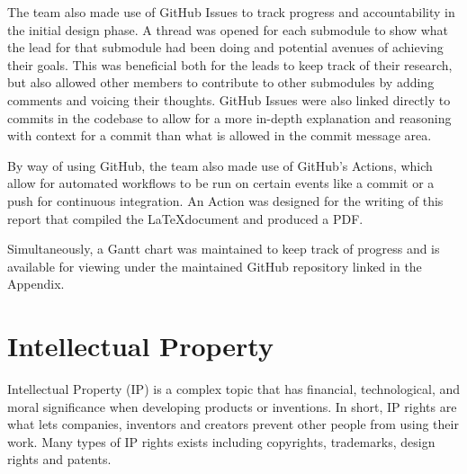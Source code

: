 \documentclass[a4paper]{article}
\begin{document}
The team also made use of GitHub Issues to track progress and accountability in 
the initial design phase. A thread was opened for each submodule to show what 
the lead for that submodule had been doing and potential avenues of achieving 
their goals. This was beneficial both for the leads to keep track of their 
research, but also allowed other members to contribute to other submodules 
by adding comments and voicing their thoughts. GitHub Issues were also linked 
directly to commits in the codebase to allow for a more in-depth explanation and
reasoning with context for a commit than what is allowed in the commit message 
area. 

By way of using GitHub, the team also made use of GitHub's Actions, which allow 
for automated workflows to be run on certain events like a commit or a push for 
continuous integration. An Action was designed for the writing of this report
that compiled the \LaTeX document and produced a PDF. 

Simultaneously, a Gantt chart was maintained to keep track of progress and is 
available for viewing under the maintained GitHub repository linked in the Appendix.

\section{Intellectual Property}
Intellectual Property (IP) is a complex topic that has financial, technological, 
and moral significance when developing products or inventions. In short, IP rights are what
lets companies, inventors and creators prevent other people from using their work\cite{perea}.
Many types of IP rights exists including copyrights, trademarks, design rights and patents.  
\end{document}
